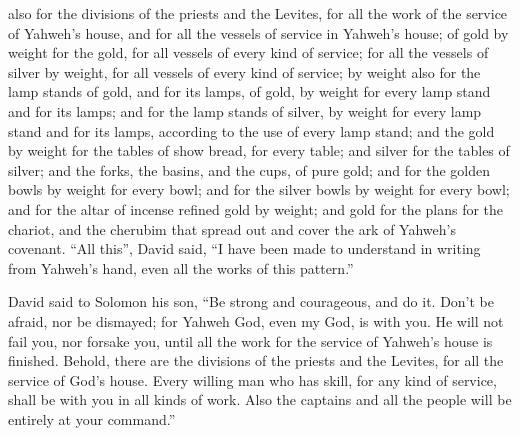 {also for the divisions of the priests and the Levites, for all the work of the service of Yahweh’s house, and for all the vessels of service in Yahweh’s house;
of gold by weight for the gold, for all vessels of every kind of service; for all the vessels of silver by weight, for all vessels of every kind of service;
by weight also for the lamp stands of gold, and for its lamps, of gold, by weight for every lamp stand and for its lamps; and for the lamp stands of silver, by weight for every lamp stand and for its lamps, according to the use of every lamp stand;
and the gold by weight for the tables of show bread, for every table; and silver for the tables of silver;
and the forks, the basins, and the cups, of pure gold; and for the golden bowls by weight for every bowl; and for the silver bowls by weight for every bowl;
and for the altar of incense refined gold by weight; and gold for the plans for the chariot, and the cherubim that spread out and cover the ark of Yahweh’s covenant.
“All this”, David said, “I have been made to understand in writing from Yahweh’s hand, even all the works of this pattern.”
\par }{\PP {}David said to Solomon his son, “Be strong and courageous, and do it. Don’t be afraid, nor be dismayed; for Yahweh God, even my God, is with you. He will not fail you, nor forsake you, until all the work for the service of Yahweh’s house is finished.
Behold, there are the divisions of the priests and the Levites, for all the service of God’s house. Every willing man who has skill, for any kind of service, shall be with you in all kinds of work. Also the captains and all the people will be entirely at your command.”

}
